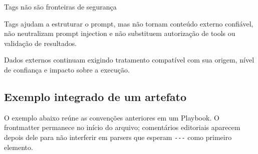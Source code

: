 \documentclass[
  10pt,
  a4paper,
  oneside]{book}
\begin{document}
\begin{warningbox}{Tags não são fronteiras de segurança}

Tags ajudam a estruturar o prompt, mas não tornam conteúdo externo
confiável, não neutralizam prompt injection e não substituem autorização
de tools ou validação de resultados.

Dados externos continuam exigindo tratamento compatível com sua origem,
nível de confiança e impacto sobre a execução.

\end{warningbox}

\hypertarget{exemplo-integrado-de-um-artefato}{%
\subsection{Exemplo integrado de um
artefato}\label{exemplo-integrado-de-um-artefato}}

O exemplo abaixo reúne as convenções anteriores em um Playbook. O
frontmatter permanece no início do arquivo; comentários editoriais
aparecem depois dele para não interferir em parsers que esperam
\texttt{-\/-\/-} como primeiro elemento.
\end{document}
